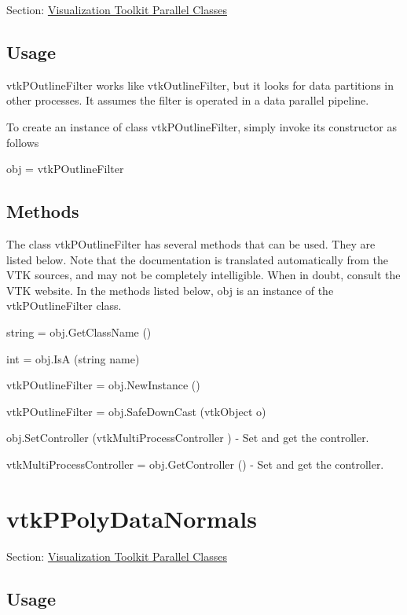 Section\-: \hyperlink{sec_vtkparallel}{Visualization Toolkit Parallel Classes} \hypertarget{vtkwidgets_vtkxyplotwidget_Usage}{}\subsection{Usage}\label{vtkwidgets_vtkxyplotwidget_Usage}
vtk\-P\-Outline\-Filter works like vtk\-Outline\-Filter, but it looks for data partitions in other processes. It assumes the filter is operated in a data parallel pipeline.

To create an instance of class vtk\-P\-Outline\-Filter, simply invoke its constructor as follows \begin{DoxyVerb}  obj = vtkPOutlineFilter
\end{DoxyVerb}
 \hypertarget{vtkwidgets_vtkxyplotwidget_Methods}{}\subsection{Methods}\label{vtkwidgets_vtkxyplotwidget_Methods}
The class vtk\-P\-Outline\-Filter has several methods that can be used. They are listed below. Note that the documentation is translated automatically from the V\-T\-K sources, and may not be completely intelligible. When in doubt, consult the V\-T\-K website. In the methods listed below, {\ttfamily obj} is an instance of the vtk\-P\-Outline\-Filter class. 
\begin{DoxyItemize}
\item {\ttfamily string = obj.\-Get\-Class\-Name ()}  
\item {\ttfamily int = obj.\-Is\-A (string name)}  
\item {\ttfamily vtk\-P\-Outline\-Filter = obj.\-New\-Instance ()}  
\item {\ttfamily vtk\-P\-Outline\-Filter = obj.\-Safe\-Down\-Cast (vtk\-Object o)}  
\item {\ttfamily obj.\-Set\-Controller (vtk\-Multi\-Process\-Controller )} -\/ Set and get the controller.  
\item {\ttfamily vtk\-Multi\-Process\-Controller = obj.\-Get\-Controller ()} -\/ Set and get the controller.  
\end{DoxyItemize}\hypertarget{vtkparallel_vtkppolydatanormals}{}\section{vtk\-P\-Poly\-Data\-Normals}\label{vtkparallel_vtkppolydatanormals}
Section\-: \hyperlink{sec_vtkparallel}{Visualization Toolkit Parallel Classes} \hypertarget{vtkwidgets_vtkxyplotwidget_Usage}{}\subsection{Usage}\label{vtkwidgets_vtkxyplotwidget_Usage}
